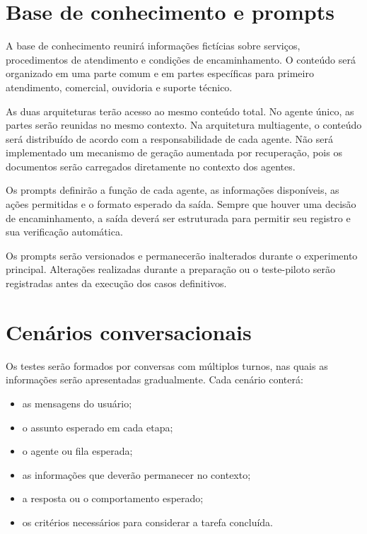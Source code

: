 \section{Base de conhecimento e prompts}\label{sec:base-prompts}

A base de conhecimento reunirá informações fictícias sobre serviços, procedimentos de atendimento e condições de encaminhamento. O conteúdo será organizado em uma parte comum e em partes específicas para primeiro atendimento, comercial, ouvidoria e suporte técnico.

As duas arquiteturas terão acesso ao mesmo conteúdo total. No agente único, as partes serão reunidas no mesmo contexto. Na arquitetura multiagente, o conteúdo será distribuído de acordo com a responsabilidade de cada agente. Não será implementado um mecanismo de geração aumentada por recuperação, pois os documentos serão carregados diretamente no contexto dos agentes.

Os prompts definirão a função de cada agente, as informações disponíveis, as ações permitidas e o formato esperado da saída. Sempre que houver uma decisão de encaminhamento, a saída deverá ser estruturada para permitir seu registro e sua verificação automática.

Os prompts serão versionados e permanecerão inalterados durante o experimento principal. Alterações realizadas durante a preparação ou o teste-piloto serão registradas antes da execução dos casos definitivos.

\section{Cenários conversacionais}\label{sec:cenarios}

Os testes serão formados por conversas com múltiplos turnos, nas quais as informações serão apresentadas gradualmente. Cada cenário conterá:

\begin{itemize}
    \item as mensagens do usuário;
    \item o assunto esperado em cada etapa;
    \item o agente ou fila esperada;
    \item as informações que deverão permanecer no contexto;
    \item a resposta ou o comportamento esperado;
    \item os critérios necessários para considerar a tarefa concluída.
\end{itemize}

